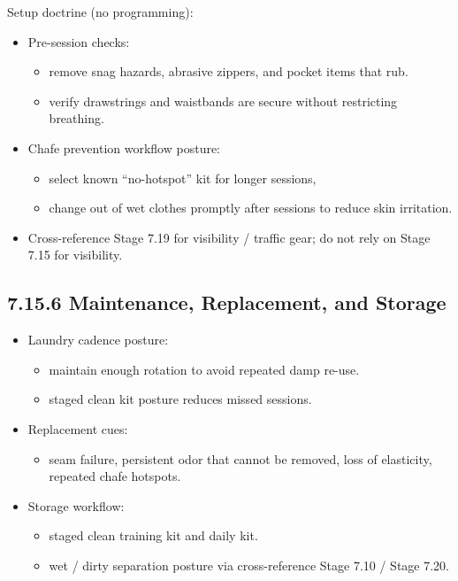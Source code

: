 \documentclass[10pt]{article}
\begin{document}
Setup doctrine (no programming):

\begin{itemize}
\item Pre-session checks:
  \begin{itemize}
  \item remove snag hazards, abrasive zippers, and pocket items that rub.
  \item verify drawstrings and waistbands are secure without restricting breathing.
  \end{itemize}
\item Chafe prevention workflow posture:
  \begin{itemize}
  \item select known “no-hotspot” kit for longer sessions,
  \item change out of wet clothes promptly after sessions to reduce skin irritation.
  \end{itemize}
\item Cross-reference Stage 7.19 for visibility / traffic gear; do not rely on Stage 7.15 for visibility.
\end{itemize}

\subsection*{7.15.6 Maintenance, Replacement, and Storage}
{}

\begin{itemize}
\item Laundry cadence posture:
  \begin{itemize}
  \item maintain enough rotation to avoid repeated damp re-use.
  \item staged clean kit posture reduces missed sessions.
  \end{itemize}
\item Replacement cues:
  \begin{itemize}
  \item seam failure, persistent odor that cannot be removed, loss of elasticity, repeated chafe hotspots.
  \end{itemize}
\item Storage workflow:
  \begin{itemize}
  \item staged clean training kit and daily kit.
  \item wet / dirty separation posture via cross-reference Stage 7.10 / Stage 7.20.
  \end{itemize}
\end{itemize}
\end{document}

